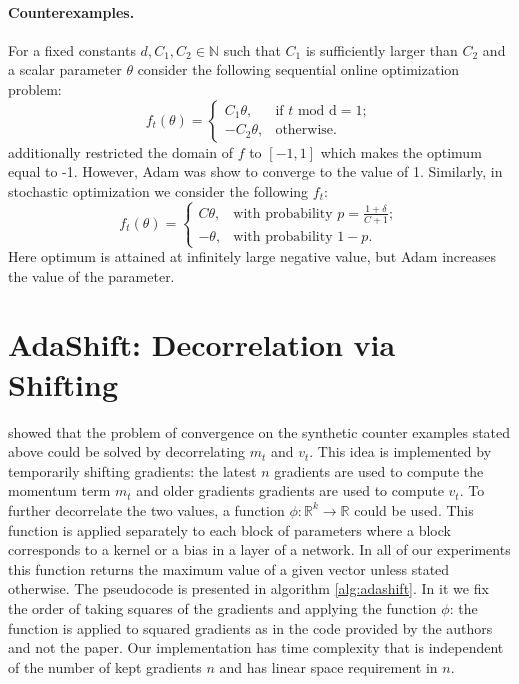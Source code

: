 \documentclass{article} %
\begin{document}
\paragraph{Counterexamples. }
For a fixed constants $d, C_1, C_2 \in \mathbb{N}$ such
that $C_1$ is sufficiently larger than
$C_2$ and a scalar parameter $\theta$ consider the
following sequential online optimization problem:
\begin{equation}\label{eq:sequential}
f_t(\theta) =  \begin{cases}
C_1\theta, & \text{if } t \text{ mod d} = 1; \\
-C_2\theta, & \text{otherwise.}
\end{cases}
\end{equation}
\cite{reddi2018on} additionally restricted the domain
of $f$ to $[-1, 1]$ which makes the optimum equal to -1.
However, Adam was show to converge to the value of 1.
Similarly, in stochastic optimization we consider the following $f_t$:
\begin{equation}\label{eq:stochastic}
    f_t(\theta) = \begin{cases}
    C\theta, & \text{with probability } p = \frac{1 + \delta}{C + 1};\\
    -\theta, & \text{with probability } 1 - p.
    \end{cases}
\end{equation}
Here optimum is attained at infinitely large negative value,
but Adam increases the value of the parameter.

\section{AdaShift: Decorrelation via Shifting}

\cite{zhou2018adashift} showed that the problem of
convergence on the synthetic counter examples stated
above could be solved by decorrelating $m_t$ and $v_t$.
This idea is implemented by temporarily shifting
gradients: the latest $n$ gradients are used to
compute the momentum term $m_t$ and older gradients
gradients are used to compute $v_t$. To further
decorrelate the two values, a function $\phi: \mathbb{R}^k
\rightarrow \mathbb{R}$ could be used. This function
is applied separately to each block of parameters where
a block corresponds to a kernel or a bias in a layer of
a network. In all of our experiments this function returns
the maximum value of a given vector unless stated otherwise. The pseudocode is presented in algorithm \ref{alg:adashift}.
In it we fix the order of taking squares of
the gradients and applying the function $\phi$:
the function is applied to squared gradients as in
the code provided by the authors and not the paper.
Our implementation has time complexity that is independent
of the number of kept gradients $n$ and
has linear space requirement in $n$.
\end{document}
